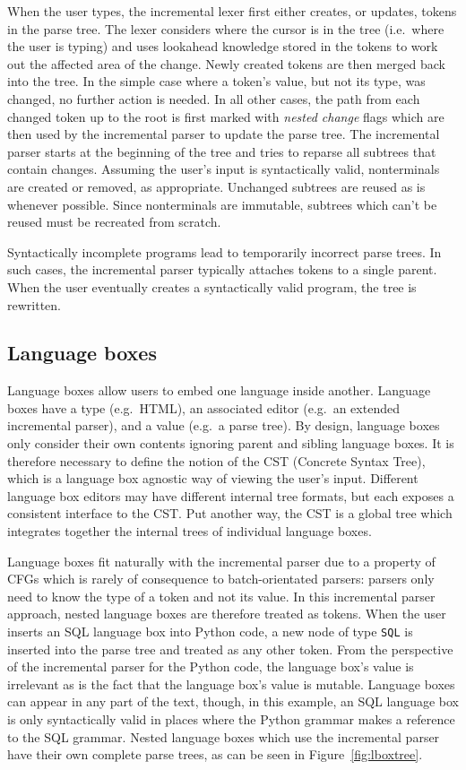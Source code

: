 \documentclass[sigplan,screen]{acmart}\settopmatter{printfolios=true,printccs=false,printacmref=false}
\begin{document}
When the user types, the incremental lexer first either creates, or updates,
tokens in the parse tree. The lexer considers where the cursor is in the tree
(i.e.~where the user is typing) and uses lookahead knowledge stored in the
tokens to work out the affected area of the change. Newly created tokens are
then merged back into the tree.  In the simple case where a token's value, but
not its type, was changed, no further action is needed. In all other cases, the
path from each changed token up to the root is first marked with \textit{nested
change} flags which are then used by the incremental parser to update the parse
tree. The incremental parser starts at the beginning of the tree and tries to
reparse all subtrees that contain changes. Assuming the user's input is
syntactically valid, nonterminals are created or removed, as appropriate.
Unchanged subtrees are reused as is whenever possible. Since nonterminals are
immutable, subtrees which can't be reused must be recreated from scratch.

Syntactically incomplete programs lead to temporarily incorrect parse trees.
In such cases, the incremental parser typically attaches tokens to a single
parent. When the user eventually creates a syntactically valid program, the
tree is rewritten.

\subsection{Language boxes}

Language boxes allow users to embed one language inside another.  Language
boxes have a type (e.g.~HTML), an associated editor (e.g.~an extended
incremental parser), and a value (e.g.~a parse tree).  By design, language
boxes only consider their own contents ignoring parent and sibling language
boxes. It is therefore necessary to define the notion of the CST (Concrete
Syntax Tree), which is a language box agnostic way of viewing the user's input.
Different language box editors may have different internal tree formats, but
each exposes a consistent interface to the CST.  Put another way, the CST is a
global tree which integrates together the internal trees of individual language
boxes.

Language boxes fit naturally with the incremental parser due to a property of
CFGs which is rarely of consequence to batch-orientated parsers: parsers only
need to know the type of a token and not its value. In this incremental parser
approach, nested language boxes are therefore treated as tokens. When the user
inserts an SQL language box into Python code, a new node of type \texttt{SQL}
is inserted into the parse tree and treated as any other token. From the
perspective of the incremental parser for the Python code, the language box's
value is irrelevant as is the fact that the language box's value is mutable.
Language boxes can appear in any part of the text, though, in this example, an
SQL language box is only syntactically valid in places where the Python grammar
makes a reference to the SQL grammar. Nested language boxes which use the
incremental parser have their own complete parse trees, as can be seen in
Figure~\ref{fig:lboxtree}.
\end{document}
